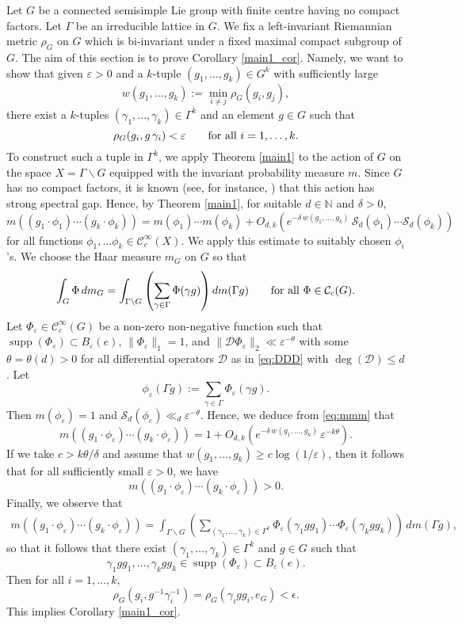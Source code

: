 \documentclass[11pt,reqno,a4paper]{amsart}
\numberwithin{equation}{section}
\newcommand{\cC}{\mathcal{C}}
\newcommand{\cS}{\mathcal{S}}
\newcommand{\eps}{\varepsilon}
\DeclareMathOperator{\supp}{supp}
\theoremstyle{theorem}
\theoremstyle{definition}
\begin{document}
Let $G$ be a connected semisimple Lie group with finite centre having no compact factors.
Let $\Gamma$ be an irreducible lattice in $G$. We fix a left-invariant Riemannian 
metric $\rho_G$ on $G$ which is bi-invariant under a fixed maximal compact subgroup of $G$.
The aim of this section is to prove Corollary \ref{main1_cor}.
Namely, we want to show that given $\eps>0$ 
and a $k$-tuple $(g_1,\ldots,g_k)\in G^k$ with sufficiently large
$$
w(g_1,\ldots,g_k):=\min_{i\ne j} \rho_G(g_i,g_j),
$$
there exist a $k$-tuples $(\gamma_1,\ldots, \gamma_k)\in \Gamma^k$
and an element $g\in G$ such that 
$$
\rho_G(g_i,g\, \gamma_i)<\eps\quad \quad\hbox{for all $i=1,\ldots,k$.}
$$
To construct such a tuple in $\Gamma^k$, we apply Theorem \ref{main1}
to the action of $G$ on the space $X=\Gamma\backslash G$ equipped with the invariant
probability measure $m$. 
Since $G$ has no compact factors, it is known (see, for instance, \cite[p.~285]{KSar})
that this action has strong spectral gap.
Hence, by Theorem \ref{main1}, 
for suitable $d\in \mathbb{N}$ and $\delta>0$,
\begin{equation}
\label{eq:mmm}
m((g_1\cdot \phi_1)\cdots (g_k\cdot \phi_k))=m(\phi_1)\cdots m(\phi_k)
+O_{d,k}\left(e^{-\delta\, w(g_1,\ldots,g_k)}\, \cS_d(\phi_1)\cdots \cS_d(\phi_k) \right)
\end{equation}
for all functions $\phi_1,\ldots \phi_k\in \cC_c^\infty(X)$.
We apply this estimate to suitably chosen $\phi_i$'s.
We choose the Haar measure $m_G$ on $G$ so that
$$
\int_G \Phi\, dm_G=
\int_{\Gamma\backslash G} \left( \sum_{\gamma\in\Gamma} \Phi(\gamma g)\right) dm(\Gamma g)
\quad\quad \hbox{for all $\Phi\in \cC_c(G)$.}
$$
Let $\Phi_\eps \in \cC_c^\infty(G)$ be 
a non-zero non-negative function such that 
$\supp(\Phi_\eps)\subset B_\eps(e)$,
$\| \Phi_\eps \|_1=1$, and
$\|\mathcal{D}\Phi_\eps\|_2\ll \eps^{-\theta}$
with some $\theta=\theta(d)>0$
for all differential operators $\mathcal{D}$ as in \eqref{eq:DDD} with $\deg(\mathcal{D})\le d$.
Let
$$
\phi_\eps(\Gamma g):=\sum_{\gamma\in\Gamma} \Phi_\eps(\gamma g).
$$
Then $m(\phi_\eps)=1$ and $\cS_d(\phi_\eps)\ll_d \eps^{-\theta}$.
Hence, we deduce from \eqref{eq:mmm} that 
$$
m((g_1\cdot \phi_\eps)\cdots (g_k\cdot \phi_\eps))=1+O_{d,k}\left(e^{-\delta\, w(g_1,\ldots,g_k)}\, \eps^{-k\theta} \right).
$$
If we take $c>k\theta/\delta$ and assume that
$w(g_1,\ldots,g_k)\ge c\log(1/\eps)$, then it follows that for all sufficiently
small $\eps>0$, we have 
$$
m((g_1\cdot \phi_\eps)\cdots (g_k\cdot \phi_\eps))>0.
$$
Finally, we observe that
\begin{align*}
m((g_1\cdot \phi_\eps)\cdots (g_k\cdot \phi_\eps))=
\int_{\Gamma\backslash G} \left(\sum_{(\gamma_1,\ldots,\gamma_k)\in \Gamma^k} \Phi_\eps(\gamma_1gg_1)\cdots \Phi_\eps(\gamma_kg g_k)\right) \, dm(\Gamma g),
\end{align*}
so that it follows that there exist
$(\gamma_1,\ldots,\gamma_k)\in \Gamma^k$ and $g\in G$ such that 
$$
\gamma_1gg_1,\ldots, \gamma_kgg_k\in \supp(\Phi_\eps)\subset B_\eps(e).
$$
Then for all $i=1,\ldots, k$, 
$$
\rho_G(g_i, g^{-1}\gamma_i^{-1})=\rho_G(\gamma_i g g_i,e_G)<\epsilon.
$$
This implies Corollary \ref{main1_cor}.
\end{document}
